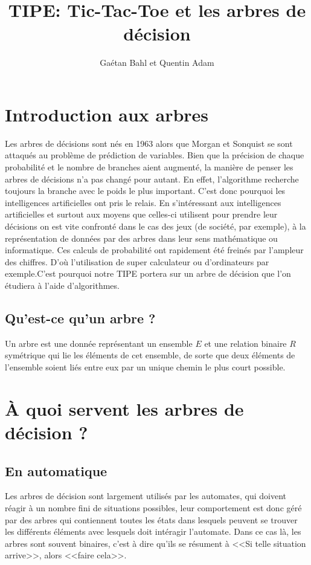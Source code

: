 \documentclass{article}
\title{TIPE: Tic-Tac-Toe et les arbres de décision}
\author{Gaétan Bahl et Quentin Adam}
\begin{document}
\maketitle
\tableofcontents
\listoffigures
{}
\clearpage

\section{Introduction aux arbres}

Les arbres de décisions sont nés en 1963 alors que Morgan et Sonquist se sont attaqués au problème de prédiction de variables. Bien que la précision de chaque probabilité et le nombre de branches aient augmenté, la manière de penser les arbres de décisions n'a pas changé pour autant. En effet, l'algorithme recherche toujours la branche avec le poids le plus important. C'est donc pourquoi les intelligences artificielles ont pris le relais.
En s'intéressant aux intelligences artificielles et surtout aux moyens que
celles-ci utilisent pour prendre leur décisions
on est vite confronté dans le cas des jeux (de société, par exemple), à la
représentation de données par des arbres dans leur sens mathématique ou
informatique. Ces calculs de probabilité ont rapidement été freinés par l'ampleur des chiffres. D'où l'utilisation de super calculateur ou d'ordinateurs par exemple.C'est pourquoi notre TIPE portera sur un arbre de décision que l'on étudiera à l'aide d'algorithmes.


\subsection{Qu'est-ce qu'un arbre ?}

Un arbre est une donnée représentant un ensemble $E$ et une relation binaire $R$
symétrique qui lie les éléments de cet ensemble,
de sorte que deux éléments de l'ensemble soient liés entre eux par un unique
chemin le plus court possible.


\section{\uppercase{à} quoi servent les arbres de décision ?}

\subsection{En automatique}

Les arbres de décision sont largement utilisés par les automates,
 qui doivent réagir à un nombre fini de situations possibles,
leur comportement est donc géré par des arbres qui contiennent
 toutes les états dans lesquels peuvent se trouver les différents
éléments avec lesquels doit intéragir l'automate.
Dans ce cas là, les arbres sont souvent binaires,
c'est à dire qu'ils se résument à <<Si telle situation arrive>>, alors <<faire
cela>>.
\end{document}
